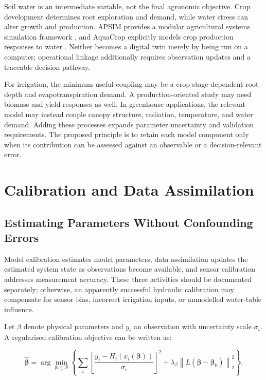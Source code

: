 \documentclass[11pt,a4paper]{article}
\begin{document}
\label{sec:4-3}

Soil water is an intermediate variable, not the final agronomic objective. Crop development determines root exploration and demand, while water stress can alter growth and production. APSIM provides a modular agricultural systems simulation framework \cite{R10}, and AquaCrop explicitly models crop production responses to water \cite{R11}. Neither becomes a digital twin merely by being run on a computer; operational linkage additionally requires observation updates and a traceable decision pathway.

For irrigation, the minimum useful coupling may be a crop-stage-dependent root depth and evapotranspiration demand. A production-oriented study may need biomass and yield responses as well. In greenhouse applications, the relevant model may instead couple canopy structure, radiation, temperature, and water demand. Adding these processes expands parameter uncertainty and validation requirements. The proposed principle is to retain each model component only when its contribution can be assessed against an observable or a decision-relevant error.

\section{Calibration and Data Assimilation}

\label{sec:5}

\subsection{Estimating Parameters Without Confounding Errors}

\label{sec:5-1}

Model calibration estimates model parameters, data assimilation updates the estimated system state as observations become available, and sensor calibration addresses measurement accuracy. These three activities should be documented separately; otherwise, an apparently successful hydraulic calibration may compensate for sensor bias, incorrect irrigation inputs, or unmodelled water-table influence.

Let $\beta$ denote physical parameters and $y_{i}$ an observation with uncertainty scale $\sigma_{i}$. A regularised calibration objective can be written as:

\begin{equation}
\hat{\boldsymbol\beta}=\arg\min_{\boldsymbol\beta\in\mathcal B}\left\{\sum_i\left[\frac{y_i-H_i(x_i(\boldsymbol\beta))}{\sigma_i}\right]^2+\lambda_\beta\left\|L(\boldsymbol\beta-\boldsymbol\beta_0)\right\|_2^2\right\}.
\label{eq:7}
\end{equation}
\end{document}
